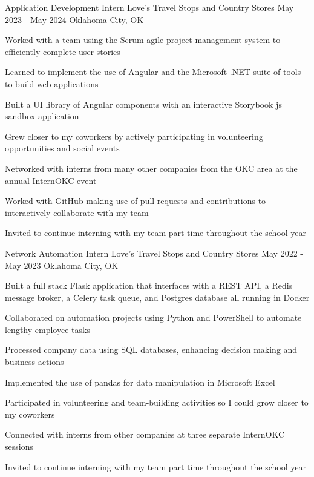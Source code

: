 \documentclass[letterpaper]{resumeconfig}
\begin{document}
\WorkExperience
    {Application Development Intern} %
    {Love's Travel Stops and Country Stores} %
    {May 2023 - May 2024} %
    {Oklahoma City, OK} %
    {
        \item Worked with a team using the Scrum agile project management system to efficiently complete user stories
        \item Learned to implement the use of Angular and the Microsoft .NET suite of tools to build web applications
        \item Built a UI library of Angular components with an interactive Storybook js sandbox application
        \item Grew closer to my coworkers by actively participating in volunteering opportunities and social events
        \item Networked with interns from many other companies from the OKC area at the annual InternOKC event
        \item Worked with GitHub making use of pull requests and contributions to interactively collaborate with my team
        \item Invited to continue interning with my team part time throughout the school year
    }
    \vspace{1em}

\WorkExperience
    {Network Automation Intern} %
    {Love's Travel Stops and Country Stores} %
    {May 2022 - May 2023} %
    {Oklahoma City, OK} %
    {
    	\item Built a full stack Flask application that interfaces with a REST API, a Redis message broker, a Celery task queue, and Postgres database all running in Docker
        \item Collaborated on automation projects using Python and PowerShell to automate lengthy employee tasks
        \item Processed company data using SQL databases, enhancing decision making and business actions
        \item Implemented the use of pandas for data manipulation in Microsoft Excel
        \item Participated in volunteering and team-building activities so I could grow closer to my coworkers
        \item Connected with interns from other companies at three separate InternOKC sessions
        \item Invited to continue interning with my team part time throughout the school year
    }
    
\end{document}
